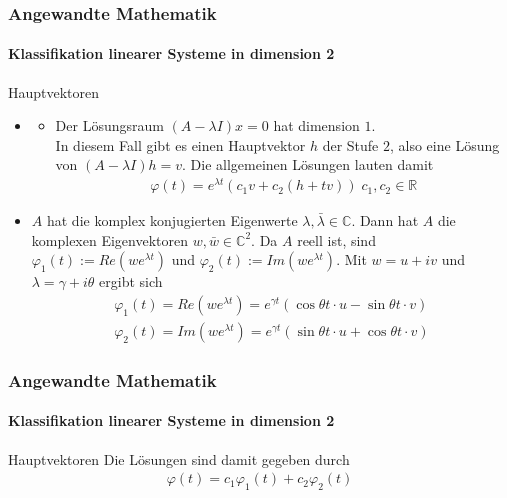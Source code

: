 \documentclass{beamer}
\begin{document}
\begin{frame}
    \frametitle{Angewandte Mathematik}
\framesubtitle{Klassifikation linearer Systeme in dimension 2}
\begin{block}{Hauptvektoren}
\begin{itemize}
    \item 
        \begin{itemize}
            \item  Der Lösungsraum $(A - \lambda I)x = 0$ hat dimension $1$. \\
                In diesem Fall gibt es einen Hauptvektor $h$ der Stufe $2$, also eine Lösung von 
                $(A-\lambda I)h = v$. Die allgemeinen Lösungen lauten damit
                \begin{align*}
                    \varphi(t) = e^{\lambda t} (c_1 v + c_2(h + tv)) \; c_1, c_2 \in \mathbb{R}
                \end{align*}
            \end{itemize}
    \item $A$ hat die komplex konjugierten Eigenwerte $\lambda, \bar{\lambda} \in \mathbb{C}$. Dann hat $A$ die komplexen Eigenvektoren 
            $w, \bar{w} \in \mathbb{C}^2$. Da $A$ reell ist, sind $\varphi_1(t):= Re (w e^{\lambda t})$ und 
            $\varphi_2(t):= Im (w e^{\lambda t})$. Mit $w = u + iv$ und $\lambda = \gamma + i \theta$ ergibt sich
            \begin{align*}
                \varphi_1(t) = Re (w e^{\lambda t}) = e^{\gamma t}(\cos \theta t \cdot u - \sin \theta t \cdot v) \\
                \varphi_2(t) = Im (w e^{\lambda t}) = e^{\gamma t}(\sin \theta t \cdot u + \cos \theta t \cdot v)
            \end{align*}

\end{itemize}

\end{block}

\end{frame}


\begin{frame}
    \frametitle{Angewandte Mathematik}
\framesubtitle{Klassifikation linearer Systeme in dimension 2}
\begin{block}{Hauptvektoren}
    Die Lösungen sind damit gegeben durch
            \begin{align*}
                \varphi(t) = c_1 \varphi_1(t) + c_2 \varphi_2(t)  
            \end{align*}


\end{block}

\end{frame}
\end{document}
